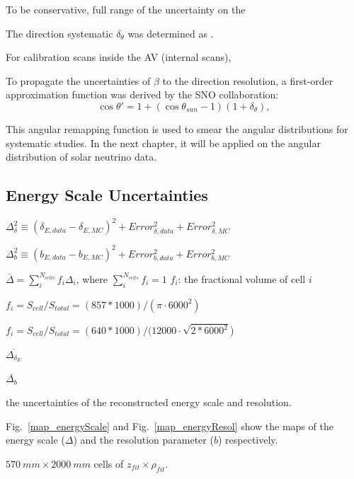 To be conservative, 
full range of the uncertainty on the 



The direction systematic $\delta_\theta$ was determined as .

For calibration scans inside the AV (internal scans), 






To propagate the uncertainties of $\beta$ to the direction resolution, a first-order approximation function was derived by the SNO collaboration\cite{drouin2012three}:
\begin{equation}\label{remapTheta}
\cos\theta'=1+(\cos\theta_{sun}-1)(1+\delta_{\theta}),
\end{equation} 
 
This angular remapping function is used to smear the angular distributions for systematic studies. In the next chapter, it will be applied on the angular distribution of solar neutrino data.  

\subsection{Energy Scale Uncertainties}


$\Delta^2_\delta\equiv (\delta_{E,data}-\delta_{E,MC})^2+Error^2_{\delta,data}+Error^2_{\delta,MC}$

$\Delta^2_b\equiv (b_{E,data}-b_{E,MC})^2+Error^2_{b,data}+Error^2_{b,MC}$

$\bar{\Delta}=\sum_i^{N_{cells}}f_i\Delta_i$, where $\sum_i^{N_{cells}}f_i=1$
$f_i$: the fractional volume of cell $i$

$f_i = S_{cell}/S_{total} = (857*1000)/(\pi\cdot6000^2)$



$f_i = S_{cell}/S_{total} = (640*1000)/(12000 \cdot \sqrt{2*6000^2}$)


$\overline{\Delta_{\delta_E}}$

$\overline{\Delta_b}$

the uncertainties of the reconstructed energy scale and resolution.

Fig.~\ref{map_energyScale} and Fig.~\ref{map_energyResol} show the maps of the energy scale ($\Delta$) and the resolution parameter ($b$) respectively.

$570~mm\times 2000~mm$ cells of $z_{fit}\times \rho_{fit}$.

%
%









